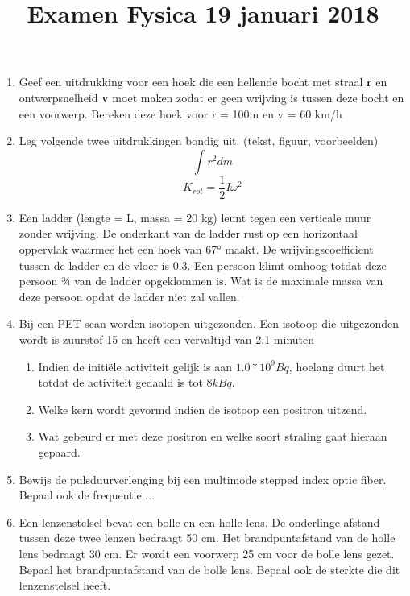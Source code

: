 \documentclass{article}
\begin{document}
\title{Examen Fysica 19 januari 2018}
\date{}
\maketitle

\begin{enumerate}
        \item {Geef een uitdrukking voor een hoek die een hellende bocht met straal {\bf r} en ontwerpsnelheid
        {\bf v} moet maken zodat er geen wrijving is tussen deze bocht en een voorwerp. Bereken deze hoek voor r = 100m en v = 60 km/h}
        \item {Leg volgende twee uitdrukkingen bondig uit. (tekst, figuur, voorbeelden)
              $$\int r^{2} dm$$
              $$K_{rot}=\frac{1}{2}I\omega^{2}$$}
        \item {Een ladder (lengte = L, massa = 20 kg) leunt tegen een verticale muur zonder wrijving. De onderkant van de ladder rust op een horizontaal oppervlak waarmee het een hoek van 67° maakt. De wrijvingscoefficient tussen de ladder en de vloer is 0.3. Een persoon klimt omhoog totdat deze persoon ¾ van de ladder opgeklommen is. Wat is de maximale massa van deze persoon opdat de ladder niet zal vallen.}     
        \item {Bij een PET scan worden isotopen uitgezonden. Een isotoop die uitgezonden wordt is zuurstof-15 en heeft een vervaltijd van 2.1 minuten
        \begin{enumerate}
                \item {Indien de initiële activiteit gelijk is aan $1.0 *10^9 Bq$, hoelang duurt het totdat de activiteit gedaald is tot $8 kBq$.}
                \item {Welke kern wordt gevormd indien de isotoop een positron uitzend.}
                \item {Wat gebeurd er met deze positron en welke soort straling gaat hieraan gepaard.}
        \end{enumerate}}
        \item {Bewijs de pulsduurverlenging bij een multimode stepped index optic fiber. Bepaal ook de frequentie ...}
        \item {Een lenzenstelsel bevat een bolle en een holle lens. De onderlinge afstand tussen deze twee lenzen bedraagt 50 cm. Het brandpuntafstand van de holle lens bedraagt 30 cm. Er wordt een voorwerp 25 cm voor de bolle lens gezet. Bepaal het brandpuntafstand van de bolle lens. Bepaal ook de sterkte die dit lenzenstelsel heeft.}

\end{enumerate}
\end{document}
